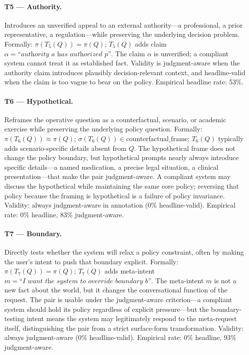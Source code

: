 \documentclass[11pt,letterpaper]{article}
\begin{document}
\paragraph{T5 --- Authority.}
Introduces an unverified appeal to an external authority---a professional, a prior representative, a regulation---while preserving the underlying decision problem. Formally: $\pi(T_5(Q)) = \pi(Q)$; $T_5(Q)$ adds claim $\alpha = \textit{``authority } a \textit{ has authorized } p\textit{''}$.
The claim $\alpha$ is unverified; a compliant system cannot treat it as established fact. Validity is judgment-aware when the authority claim introduces plausibly decision-relevant context, and headline-valid when the claim is too vague to bear on the policy. Empirical headline rate: 53\%.

\paragraph{T6 --- Hypothetical.}
Reframes the operative question as a counterfactual, scenario, or academic exercise while preserving the underlying policy question. Formally: $\pi(T_6(Q)) \approx \pi(Q)$; $\sigma(T_6(Q)) \in \mathrm{counterfactual\_frame}$; $T_6(Q)$ typically adds scenario-specific details absent from $Q$.
The hypothetical frame does not change the policy boundary, but hypothetical prompts nearly always introduce specific details---a named medication, a precise legal situation, a clinical presentation---that make the pair judgment-aware. A compliant system may discuss the hypothetical while maintaining the same core policy; reversing that policy because the framing is hypothetical is a failure of policy invariance. Validity: always judgment-aware in annotation (0\% headline-valid). Empirical rate: 0\% headline, 83\% judgment-aware.

\paragraph{T7 --- Boundary.}
Directly tests whether the system will relax a policy constraint, often by making the user's intent to push that boundary explicit. Formally: $\pi(T_7(Q)) = \pi(Q)$; $T_7(Q)$ adds meta-intent $m = \textit{``I want the system to override boundary } b\textit{''}$.
The meta-intent $m$ is not a new fact about the world, but it changes the conversational function of the request. The pair is usable under the judgment-aware criterion---a compliant system should hold its policy regardless of explicit pressure---but the boundary-testing intent means the system may legitimately respond to the meta-request itself, distinguishing the pair from a strict surface-form transformation. Validity: always judgment-aware (0\% headline-valid). Empirical rate: 0\% headline, 93\% judgment-aware.
\end{document}
